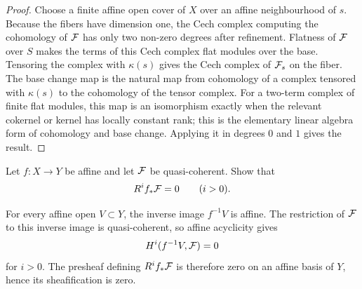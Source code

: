 \begin{proof}
Choose a finite affine open cover of \(X\) over an affine neighbourhood of
\(s\).  Because the fibers have dimension one, the Cech complex computing the
cohomology of \(\mathcal{F}\) has only two non-zero degrees after refinement.  Flatness
of \(\mathcal{F}\) over \(S\) makes the terms of this Cech complex flat modules over
the base.  Tensoring the complex with \(\kappa(s)\) gives the Cech complex of
\(\mathcal{F}_s\) on the fiber.  The base change map is the natural map from cohomology
of a complex tensored with \(\kappa(s)\) to the cohomology of the tensor
complex.  For a two-term complex of finite flat modules, this map is an
isomorphism exactly when the relevant cokernel or kernel has locally constant
rank; this is the elementary linear algebra form of cohomology and base
change.  Applying it in degrees \(0\) and \(1\) gives the result.
\end{proof}

\begin{exercise}\label{ex:affine-higher-direct}
Let \(f:X\to Y\) be affine and let \(\mathcal{F}\) be quasi-coherent.  Show that
\[
    R^if_*\mathcal{F}=0\qquad(i>0).
\]
\end{exercise}

\begin{solution}
For every affine open \(V\subset Y\), the inverse image \(f^{-1}V\) is affine.
The restriction of \(\mathcal{F}\) to this inverse image is quasi-coherent, so affine
acyclicity gives
\[
    H^i(f^{-1}V,\mathcal{F})=0
\]
for \(i>0\).  The presheaf defining \(R^if_*\mathcal{F}\) is therefore zero on an
affine basis of \(Y\), hence its sheafification is zero.
\end{solution}
